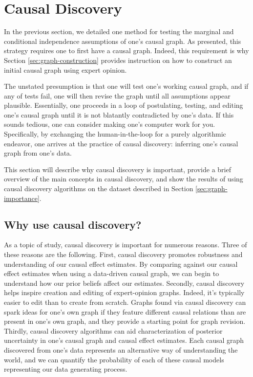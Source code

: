 \section{Causal Discovery}
\label{sec:causal-discovery}

In the previous section, we detailed one method for testing the marginal and conditional independence assumptions of one's causal graph.
As presented, this strategy requires one to first have a causal graph.
Indeed, this requirement is why Section \ref{sec:graph-construction} provides instruction on how to construct an initial causal graph using expert opinion.

The unstated presumption is that one will test one's working causal graph, and if any of tests fail, one will then revise the graph until all assumptions appear plausible.
Essentially, one proceeds in a loop of postulating, testing, and editing one's causal graph until it is not blatantly contradicted by one's data.
If this sounds tedious, one can consider making one's computer work for you.
Specifically, by exchanging the human-in-the-loop for a purely algorithmic endeavor, one arrives at the practice of  causal discovery: inferring one's causal graph from one's data.

This section will describe why causal discovery is important, provide a brief overview of the main concepts in causal discovery, and show the results of using causal discovery algorithms on the dataset described in Section \ref{sec:graph-importance}.

\subsection{Why use causal discovery?}
\label{sec:why-causal-discovery}

As a topic of study, causal discovery is important for numerous reasons.
Three of these reasons are the following.
First, causal discovery promotes robustness and understanding of our causal effect estimates.
By comparing against our causal effect estimates when using a data-driven causal graph, we can begin to understand how our prior beliefs affect our estimates.
Secondly, causal discovery helps inspire creation and editing of expert-opinion graphs.
Indeed, it's typically easier to edit than to create from scratch.
Graphs found via causal discovery can spark ideas for one's own graph if they feature different causal relations than are present in one's own graph, and they provide a starting point for graph revision.
Thirdly, causal discovery algorithms can aid characterization of posterior uncertainty in one's causal graph and causal effect estimates.
Each causal graph discovered from one's data represents an alternative way of understanding the world, and we can quantify the probability of each of these causal models representing our data generating process.

